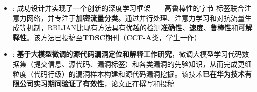 \documentclass[zh]{resume}
\begin{document}
{}
\vspace{-0.2cm}
\begin{itemize}
  \item {}:
    成功设计并实现了一个创新的深度学习框架——高鲁棒性的字节-标签联合注意力网络，并专注于\textbf{加密流量分类}。通过并行处理、注意力学习和对抗流量生成等机制，RBLJAN比现有方法具有优越的检测\textbf{准确性}、\textbf{速度}、\textbf{鲁棒性}和\textbf{可解释性}。该方法已投稿至\textbf{TDSC}期刊（\textbf{CCF-A}类，学生一作）
    {\scriptsize{}}
  \item {}:
    \textbf{基于大模型微调的源代码漏洞定位和解释工作研究}，微调大模型学习代码数据集（提交信息、源代码、漏洞标签）和各类漏洞的先验知识，从而完成更细粒度（代码行级）的漏洞样本构建和源代码漏洞挖掘。该技术\textbf{已在华为技术有限公司实习期间验证了有效性}，论文正在撰写和投稿
    {\hspace{.5em}\scriptsize{}}
\end{itemize}
\vspace{-0.1cm}
{}
\vspace{-0.2cm}
\end{document}
